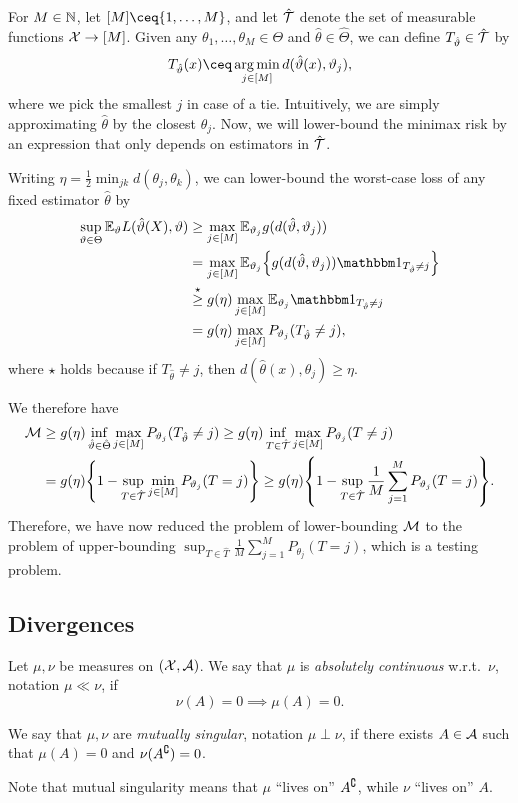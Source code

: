 For $M \in \NN$, let $[M] \ceq \qty{1, \dotsc, M}$, and let $\hat \TT$ denote the set of measurable functions $\XX \to [M]$. Given any $\theta_1, \dotsc, \theta_M \in \Theta$ and $\hat\theta \in \hat\Theta$, we can define $T_{\hat\theta} \in \hat\TT$ by
\[
T_{\hat\theta}(x) \ceq \argmin_{j \in [M]} d(\hat\theta(x), \theta_j), 
\]
where we pick the smallest $j$ in case of a tie. Intuitively, we are simply approximating $\hat\theta$ by the closest $\theta_j$. Now, we will lower-bound the minimax risk by an expression that only depends on estimators in $\hat\TT$. 

Writing $\eta = \frac12 \min_{jk} d(\theta_j, \theta_k)$, we can lower-bound the worst-case loss of any fixed estimator $\hat\theta$ by 
\begin{align*}
	\sup_{\theta \in \Theta} \EE_\theta L(\hat\theta(X), \theta) &\geq \max_{j \in [M]} \EE_{\theta_j} g(d(\hat\theta, \theta_j)) \\
	&= \max_{j \in [M]} \EE_{\theta_j} \qty{g(d(\hat\theta, \theta_j)) \ind_{T_{\hat\theta} \neq j}} \\
	&\overset\star\geq g(\eta) \max_{j \in [M]} \EE_{\theta_j} \ind_{T_{\hat\theta} \neq j} \\
	&= g(\eta) \max_{j \in [M]} P_{\theta_j}(T_{\hat\theta} \neq j), 
\end{align*}
where $\star$ holds because if $T_{\hat\theta} \neq j$, then $d(\hat\theta(x), \theta_j) \geq \eta$. 

We therefore have
\begin{align*}
	\Cal M &\geq g(\eta) \inf_{\hat\theta \in \hat\Theta} \max_{j \in [M]} P_{\theta_j}(T_{\hat\theta} \neq j) \geq g(\eta) \inf_{T \in \hat\TT} \max_{j \in [M]} P_{\theta_j}(T \neq j) \\
	&= g(\eta) \qty{1 - \sup_{T \in \hat\TT} \min_{j \in [M]} P_{\theta_j}(T = j)} \geq g(\eta) \qty{1 - \sup_{T \in \hat\TT} \frac1M \sum_{j=1}^M P_{\theta_j}(T = j)}. 
\end{align*}
Therefore, we have now reduced the problem of lower-bounding $\Cal M$ to the problem of upper-bounding $\sup_{T \in \hat T} \frac1M \sum_{j=1}^M P_{\theta_j}(T = j)$, which is a testing problem. 

\subsection{Divergences}
\begin{definition}
	Let $\mu, \nu$ be measures on $(\XX, \AA)$. We say that $\mu$ is \emph{absolutely continuous} w.r.t.\ $\nu$, notation $\mu \ll\nu$, if
	\[
	\nu(A) = 0 \implies \mu(A) = 0. 
	\]
	
	We say that $\mu, \nu$ are \emph{mutually singular}, notation $\mu \perp \nu$, if there exists $A \in \AA$ such that $\mu(A) = 0$ and $\nu(A\C) = 0$.
\end{definition}
Note that mutual singularity means that $\mu$ ``lives on'' $A\C$, while $\nu$ ``lives on'' $A$. 


